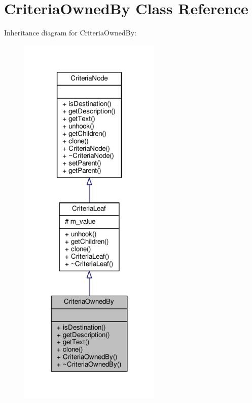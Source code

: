 \hypertarget{classCriteriaOwnedBy}{}\section{Criteria\+Owned\+By Class Reference}
\label{classCriteriaOwnedBy}


Inheritance diagram for Criteria\+Owned\+By\+:
\nopagebreak
\begin{figure}[H]
\begin{center}
\leavevmode
\includegraphics[width=192pt]{df/d4c/classCriteriaOwnedBy__inherit__graph}
\end{center}
\end{figure}


